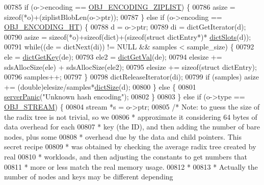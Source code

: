 \begin{DoxyCode}
{00785         \textcolor{keywordflow}{if} (o->encoding == \hyperlink{server_8h_aabf064ede983103f1fd0df2086e84eee}{OBJ\_ENCODING\_ZIPLIST}) \{
00786             asize = \textcolor{keyword}{sizeof}(*o)+(ziplistBlobLen(o->ptr));
00787         \} \textcolor{keywordflow}{else} \textcolor{keywordflow}{if} (o->encoding == \hyperlink{server_8h_a9c10219f68afc557d510d108257d238b}{OBJ\_ENCODING\_HT}) \{
00788             d = o->ptr;
00789             di = dictGetIterator(d);
00790             asize = \textcolor{keyword}{sizeof}(*o)+\textcolor{keyword}{sizeof}(dict)+(\textcolor{keyword}{sizeof}(\textcolor{keyword}{struct} dictEntry*)*
      \hyperlink{dict_8h_aca9596be4bcc2caa07c17dd8cebcceec}{dictSlots}(d));
00791             \textcolor{keywordflow}{while}((de = dictNext(di)) != NULL && samples < sample\_size) \{
00792                 ele = \hyperlink{dict_8h_a3271c334309904a3086deca94f96e46e}{dictGetKey}(de);
00793                 ele2 = \hyperlink{dict_8h_ae8d2cc391873b2bea2b87c4f80f43120}{dictGetVal}(de);
00794                 elesize += sdsAllocSize(ele) + sdsAllocSize(ele2);
00795                 elesize += \textcolor{keyword}{sizeof}(\textcolor{keyword}{struct} dictEntry);
00796                 samples++;
00797             \}
00798             dictReleaseIterator(di);
00799             \textcolor{keywordflow}{if} (samples) asize += (\textcolor{keywordtype}{double})elesize/samples*\hyperlink{dict_8h_af193430dd3d5579a52b194512f72c1f0}{dictSize}(d);
00800         \} \textcolor{keywordflow}{else} \{
00801             \hyperlink{server_8h_a11cc378e7778a830b41240578de3b204}{serverPanic}(\textcolor{stringliteral}{"Unknown hash encoding"});
00802         \}
00803     \} \textcolor{keywordflow}{else} \textcolor{keywordflow}{if} (o->type == \hyperlink{server_8h_a2c2cc41300ca6b9daca7ea8a6d66edc6}{OBJ\_STREAM}) \{
00804         stream *s = o->ptr;
00805         \textcolor{comment}{/* Note: to guess the size of the radix tree is not trivial, so we}
00806 \textcolor{comment}{         * approximate it considering 64 bytes of data overhead for each}
00807 \textcolor{comment}{         * key (the ID), and then adding the number of bare nodes, plus some}
00808 \textcolor{comment}{         * overhead due by the data and child pointers. This secret recipe}
00809 \textcolor{comment}{         * was obtained by checking the average radix tree created by real}
00810 \textcolor{comment}{         * workloads, and then adjusting the constants to get numbers that}
00811 \textcolor{comment}{         * more or less match the real memory usage.}
00812 \textcolor{comment}{         *}
00813 \textcolor{comment}{         * Actually the number of nodes and keys may be different depending}
}
\end{DoxyCode}
